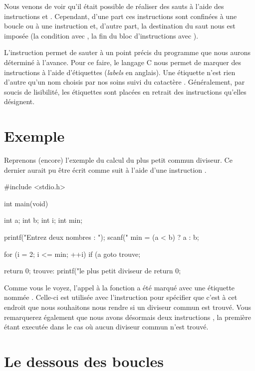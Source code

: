 Nous venons de voir qu'il était possible de réaliser des sauts à
l'aide des instructions  et . Cependant,
d'une part ces instructions sont confinées à une boucle ou à une
instruction  et, d'autre part, la destination du saut
nous est imposée (la condition avec , la fin du bloc
d'instructions avec ).

L'instruction  permet de sauter à un point précis du
programme que nous aurons déterminé à l'avance. Pour ce faire, le
langage C nous permet de marquer des instructions à l'aide
d'étiquettes (\emph{labels} en anglais). Une étiquette n'est rien
d'autre qu'un nom choisis par nos soins suivi du catactère
\mybox{:}. Généralement, par soucis de lisibilité, les étiquettes sont
placées en retrait des instructions qu'elles désignent.

\section{Exemple}
\label{exemple-11}

Reprenons (encore) l'exemple du calcul du plus petit commun
diviseur. Ce dernier aurait pu être écrit comme suit à l'aide d'une
instruction .

\begin{C}
  #include <stdio.h>


  int main(void) { int a; int b; int i; int min;

    printf("Entrez deux nombres : "); scanf("%
    min = (a < b) ? a : b;

    for (i = 2; i <= min; ++i) { if (a %
      { goto trouve; } }

    return 0; trouve: printf("le plus petit diviseur
    de %
    return 0; }
\end{C}

Comme vous le voyez, l'appel à la fonction  a été
marqué avec une étiquette nommée . Celle-ci est utilisée
avec l'instruction  pour spécifier que c'est à cet endroit
que nous souhaitons nous rendre si un diviseur commun est trouvé. Vous
remarquerez également que nous avons désormais deux instructions
, la première étant executée dans le cas où aucun
diviseur commun n'est trouvé.

\section{Le dessous des boucles}
\label{le-dessous-des-boucles}


